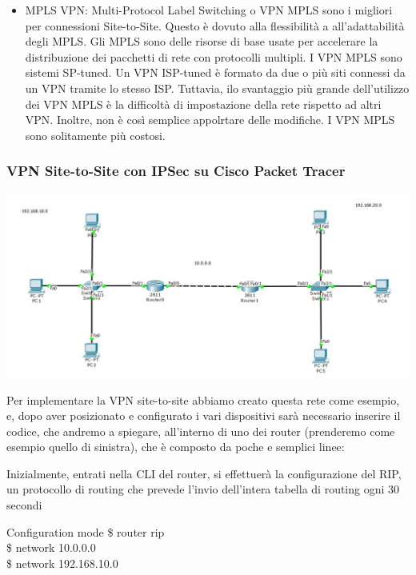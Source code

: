 \begin{itemize}
    \item MPLS VPN: Multi-Protocol Label Switching o VPN MPLS sono i migliori per connessioni Site-to-Site. Questo è dovuto alla flessibilità a all’adattabilità degli MPLS. Gli MPLS sono delle risorse di base usate per accelerare la distribuzione dei pacchetti di rete con protocolli multipli. I VPN MPLS sono sistemi SP-tuned. Un VPN ISP-tuned è formato da due o più siti connessi da un VPN tramite lo stesso ISP. Tuttavia, ilo svantaggio più grande dell’utilizzo dei VPN MPLS è la difficoltà di impostazione della rete rispetto ad altri VPN. Inoltre, non è così semplice appolrtare delle modifiche. I VPN MPLS sono solitamente più costosi.
\end{itemize}

\subsubsection{VPN Site-to-Site con IPSec su Cisco Packet Tracer}
\begin{center}
    \includegraphics[width=\linewidth]{images/07.routing-sicurezza/vpn/01.jpg}
\end{center}

Per implementare la VPN site-to-site abbiamo creato questa rete come esempio, e, dopo aver posizionato e configurato i vari dispositivi sarà necessario inserire il codice, che andremo a spiegare, all’interno di uno dei router (prenderemo come esempio quello di sinistra), che è composto da poche e semplici linee:

Inizialmente, entrati nella CLI del router, si effettuerà la configurazione del RIP, un protocollo di routing che prevede l'invio dell'intera tabella di routing ogni 30 secondi

\begin{fcmds}{Configuration mode}
    \$ router rip\\
    \$ network 10.0.0.0\\
    \$ network 192.168.10.0
\end{fcmds}

